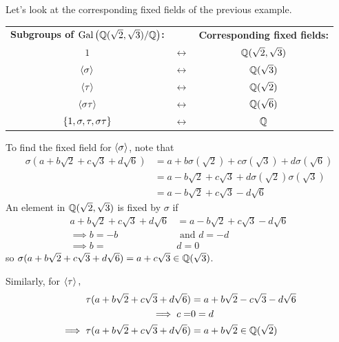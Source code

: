 \begin{example} Let's look at the corresponding fixed fields of the previous example.

    \begin{center}
        \begin{tabular}{ccc}
            \textbf{Subgroups of $\text{Gal}\left(\mathbb{Q}({\sqrt{2}}, \sqrt{3})/\mathbb{Q}\right)$:} & & \textbf{Corresponding fixed fields:} \\ 
            \noalign{\medskip}
            $1$ & $\longleftrightarrow$ & $\mathbb{Q}(\sqrt{2}, \sqrt{3})$ \\
            $\left\langle \sigma \right\rangle$ & $\longleftrightarrow$ & $\mathbb{Q}(\sqrt{3})$ \\
            $\left\langle \tau \right\rangle$ & $\longleftrightarrow$ & $\mathbb{Q}(\sqrt{2})$ \\
            $\left\langle \sigma \tau \right\rangle$ & $\longleftrightarrow$ & $\mathbb{Q}(\sqrt{6})$ \\ 
            $\left\{1, \sigma, \tau, \sigma \tau\right\}$ & $\longleftrightarrow$ & $\mathbb{Q}$
        \end{tabular}
    \end{center}
    To find the fixed field for $\left\langle \sigma \right\rangle$, note that
    \begin{align*}
        \sigma(a+b\sqrt{2}+c\sqrt{3}+d\sqrt{6}) &= a + b\sigma(\sqrt{2})+c\sigma(\sqrt{3})+d\sigma(\sqrt{6}) \\
        &= a-b\sqrt{2}+c\sqrt{3}+d\sigma(\sqrt{2})\sigma(\sqrt{3}) \\
        &= a-b\sqrt{2}+c\sqrt{3}-d\sqrt{6}
    \end{align*}
    An element in $\mathbb{Q}(\sqrt{2}, \sqrt{3})$ is fixed by $\sigma$ if 
    \begin{align*}
        a+b\sqrt{2} + c\sqrt{3} + d\sqrt{6} &= a-b\sqrt{2}+c\sqrt{3}-d\sqrt{6} \\
        \implies b=-b &\text{ and } d = -d \\
        \implies b=&d=0
    \end{align*}
    so $\sigma(a+b\sqrt{2}+c\sqrt{3}+d\sqrt{6}) = a+c\sqrt{3} \in \mathbb{Q}(\sqrt{3})$.

    Similarly, for $\left\langle \tau \right\rangle,$
    \begin{align*}
        \tau(a+b\sqrt{2}+c\sqrt{3}+d\sqrt{6}) &= a + b\sqrt{2}-c\sqrt{3}-d\sqrt{6} \\
        \implies c = &0 = d \\
        \implies \tau(a+b\sqrt{2}+c\sqrt{3}+d\sqrt{6})&= a + b\sqrt{2} \in \mathbb{Q}(\sqrt{2})
    \end{align*}
\end{example}

